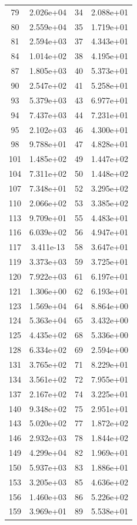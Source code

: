 \documentclass[12pt]{article}
\begin{document}
\begin{longtable}{@{}cccc@{}}
79 & 2.026e+04 & 34 & 2.088e+01 \\
80 & 2.559e+04 & 35 & 1.719e+01 \\
81 & 2.594e+03 & 37 & 4.343e+01 \\
84 & 1.014e+02 & 38 & 4.195e+01 \\
87 & 1.805e+03 & 40 & 5.373e+01 \\
90 & 2.547e+02 & 41 & 5.258e+01 \\
93 & 5.379e+03 & 43 & 6.977e+01 \\
94 & 7.437e+03 & 44 & 7.231e+01 \\
95 & 2.102e+03 & 46 & 4.300e+01 \\
98 & 9.788e+01 & 47 & 4.828e+01 \\
101 & 1.485e+02 & 49 & 1.447e+02 \\
104 & 7.311e+02 & 50 & 1.448e+02 \\
107 & 7.348e+01 & 52 & 3.295e+02 \\
110 & 2.066e+02 & 53 & 3.385e+02 \\
113 & 9.709e+01 & 55 & 4.483e+01 \\
116 & 6.039e+02 & 56 & 4.947e+01 \\
117 & 3.411e-13 & 58 & 3.647e+01 \\
119 & 3.373e+03 & 59 & 3.725e+01 \\
120 & 7.922e+03 & 61 & 6.197e+01 \\
121 & 1.306e+00 & 62 & 6.193e+01 \\
123 & 1.569e+04 & 64 & 8.864e+00 \\
124 & 5.363e+04 & 65 & 3.432e+00 \\
125 & 4.435e+02 & 68 & 5.336e+00 \\
128 & 6.334e+02 & 69 & 2.594e+00 \\
131 & 3.765e+02 & 71 & 8.229e+01 \\
134 & 3.561e+02 & 72 & 7.955e+01 \\
137 & 2.167e+02 & 74 & 3.225e+01 \\
140 & 9.348e+02 & 75 & 2.951e+01 \\
143 & 5.020e+02 & 77 & 1.872e+02 \\
146 & 2.932e+03 & 78 & 1.844e+02 \\
149 & 4.299e+04 & 82 & 1.969e+01 \\
150 & 5.937e+03 & 83 & 1.886e+01 \\
153 & 3.205e+03 & 85 & 4.636e+02 \\
156 & 1.460e+03 & 86 & 5.226e+02 \\
159 & 3.969e+01 & 89 & 5.538e+01 \\

\end{longtable}
\end{document}

